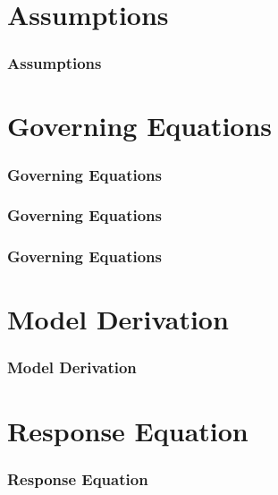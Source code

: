\documentclass{beamer}                  %
\newcommand{\sectiontitleII}{Assumptions}
\newcommand{\sectiontitleIII}{Governing Equations}
\newcommand{\sectiontitleIV}{Model Derivation}
\newcommand{\sectiontitleV}{Response Equation}
\begin{document}
\section{\sectiontitleII}

	\begin{frame}[label=sectionII,containsverbatim] \small
	
		
	\end{frame}

	\begin{frame} \small
		\frametitle{\sectiontitleII}
			
	\end{frame}	

\section{\sectiontitleIII}

	\begin{frame}[label=sectionIII] \small
		\frametitle{\sectiontitleIII}
		

		\btVFill
	\end{frame}	
	
	\begin{frame} \small
		\frametitle{\sectiontitleIII}
		
		\btVFill
	\end{frame}	

	\begin{frame} \small
		\frametitle{\sectiontitleIII}

		

			
	\end{frame}	

\section{\sectiontitleIV}

	\begin{frame}[label=sectionIV] \small
		\frametitle{\sectiontitleIV}
		
	\end{frame}	

\section{\sectiontitleV}

	\begin{frame}[label=sectionV] \small
		\frametitle{\sectiontitleV}
		
	\end{frame}	
\end{document}
